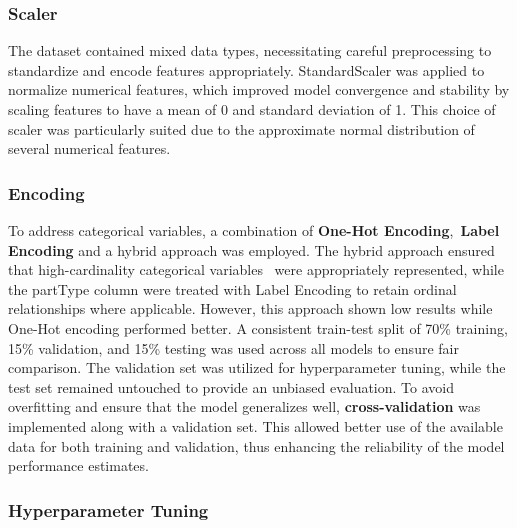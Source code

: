 \documentclass{article}
\begin{document}
\subsubsection{Scaler}

The dataset contained mixed data types, necessitating careful preprocessing to standardize and encode features appropriately. StandardScaler was applied to normalize numerical features, which improved model convergence and stability by scaling features to have a mean of 0 and standard deviation of 1. This choice of scaler was particularly suited due to the approximate normal distribution of several numerical features.

\subsubsection{Encoding}

To address categorical variables, a combination of \textbf{One-Hot Encoding}, \textbf{Label Encoding} and a hybrid approach was employed. The hybrid approach ensured that high-cardinality categorical variables  were appropriately represented, while the partType column were treated with Label Encoding to retain ordinal relationships where applicable. However, this approach shown low results while One-Hot encoding performed better. A consistent train-test split of 70\% training, 15\% validation, and 15\% testing was used across all models to ensure fair comparison. The validation set was utilized for hyperparameter tuning, while the test set remained untouched to provide an unbiased evaluation.
To avoid overfitting and ensure that the model generalizes well, \textbf{cross-validation} was implemented along with a validation set. This allowed better use of the available data for both training and validation, thus enhancing the reliability of the model performance estimates.

\subsubsection{Hyperparameter Tuning}
\end{document}
